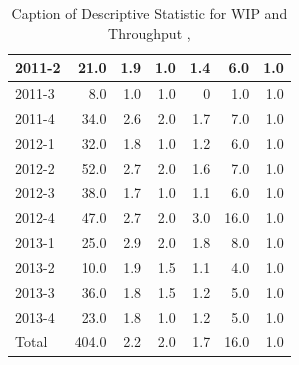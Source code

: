 \documentclass[UKenglish]{ifimaster}  %
\begin{document}
\begin{appendices}
\begin{table}[!htbp]
\begin{adjustwidth}{-2.5cm}{}
{{\begin{tabular}{ | l | r | r | r | r | r | r | }
2011-2 & 21.0 & 1.9 & 1.0 & 1.4 & 6.0 & 1.0\\ \hline
2011-3 & 8.0 & 1.0 & 1.0 & 0 & 1.0 & 1.0\\ \hline
2011-4 & 34.0 & 2.6 & 2.0 & 1.7 & 7.0 & 1.0\\ \hline
2012-1 & 32.0 & 1.8 & 1.0 & 1.2 & 6.0 & 1.0\\ \hline
2012-2 & 52.0 & 2.7 & 2.0 & 1.6 & 7.0 & 1.0\\ \hline
2012-3 & 38.0 & 1.7 & 1.0 & 1.1 & 6.0 & 1.0\\ \hline
2012-4 & 47.0 & 2.7 & 2.0 & 3.0 & 16.0 & 1.0\\ \hline
2013-1 & 25.0 & 2.9 & 2.0 & 1.8 & 8.0 & 1.0\\ \hline
2013-2 & 10.0 & 1.9 & 1.5 & 1.1 & 4.0 & 1.0\\ \hline
2013-3 & 36.0 & 1.8 & 1.5 & 1.2 & 5.0 & 1.0\\ \hline
2013-4 & 23.0 & 1.8 & 1.0 & 1.2 & 5.0 & 1.0\\ \hline
Total & 404.0 & 2.2 & 2.0 & 1.7 & 16.0 & 1.0\\ \hline
\end{tabular}
}
}
\end{adjustwidth}
\caption[Optional caption for list of figures]{Caption of Descriptive Statistic for WIP and Throughput  , }
\label{DS:10:1}
\end{table}


\end{appendices}
\end{document}
